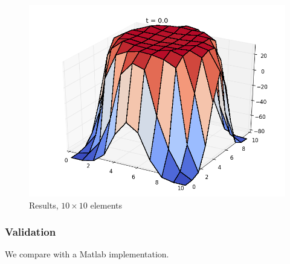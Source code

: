 \begin{figure}[ht]
  \centering 
  \includegraphics[width=0.9\columnwidth]{examples/example-0402/doc/figures/current_run_l1x1_n10x10_i1_s0_p1__t0.png} 
  \caption{Results, $10 \times 10$ elements}
  \label{example-0402-current-run2-fig}
\end{figure}

%
%
\subsubsection{Validation}
%
We compare with a Matlab implementation.
%
